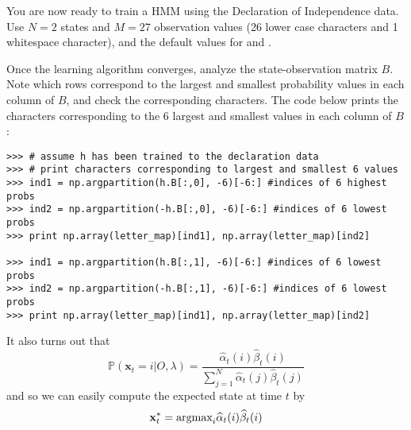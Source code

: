 \begin{problem}
You are now ready to train a HMM using the Declaration of Independence data.
Use $N=2$ states and $M=27$ observation values (26 lower case characters and 1 whitespace character),
and the default values for  and .

Once the learning algorithm converges, analyze the state-observation matrix $B$.
Note which rows correspond to the largest and smallest probability values in each column of $B$, 
and check the corresponding characters.
The code below prints the characters corresponding to the 6 largest and smallest values in each column of $B$:
\begin{lstlisting}
>>> # assume h has been trained to the declaration data
>>> # print characters corresponding to largest and smallest 6 values
>>> ind1 = np.argpartition(h.B[:,0], -6)[-6:] #indices of 6 highest probs
>>> ind2 = np.argpartition(-h.B[:,0], -6)[-6:] #indices of 6 lowest probs
>>> print np.array(letter_map)[ind1], np.array(letter_map)[ind2]

>>> ind1 = np.argpartition(h.B[:,1], -6)[-6:] #indices of 6 lowest probs
>>> ind2 = np.argpartition(-h.B[:,1], -6)[-6:] #indices of 6 lowest probs
>>> print np.array(letter_map)[ind1], np.array(letter_map)[ind2]
\end{lstlisting}
\end{problem}
It also turns out that
\begin{equation*}
\mathbb{P}(\mathbf{x}_{t} = i | O, \lambda) = \frac{\widehat{\alpha}_{t}(i)\widehat{\beta}_{t}(i)}{\sum_{j=1}^{N} \widehat{\alpha}_{t}(j)\widehat{\beta}_{t}(j)}
\end{equation*}
and so we can easily compute the expected state at time $t$ by
\begin{equation*}
\mathbf{x}_{t}^{*} = \mbox{argmax}_{i} \widehat{\alpha}_{t}(i) \widehat{\beta}_{t}(i)
\end{equation*}



